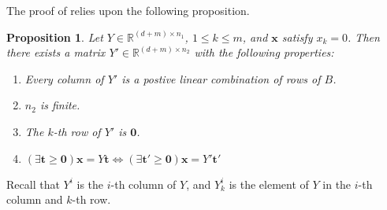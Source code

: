 \documentclass[fleqn]{article}
\renewcommand{\vec}[1]{\mathbf{#1}}
\newcommand{\R}{\mathbb{R}}
\newcommand{\0}{\vec{0}}
\newcommand{\x}{\vec{x}}
\renewcommand{\t}{\vec{t}}
\newcommand{\Yi}{Y^i_{k}}
\newtheorem{Prop}{Proposition}
\begin{document}
The proof of {\Hint} relies upon the following proposition.
\begin{Prop}{\label{Hintset}
Let $Y \in \R^{(d+m)\times n_1}$, $1 \leq k \leq m$, and $\x$ satisfy $x_k = 0$.  Then there exists a matrix $Y' \in \R^{(d+m)\times n_2}$ with the following properties:
  \begin{enumerate}
    \item Every column of $Y'$ is a postive linear combination of rows of $B$.
    \item $n_2$ is finite.
    \item The $k$-th row of $Y'$ is $\0$.
    \item \((\exists \t\geq\0)\x = Y\t \Leftrightarrow (\exists \t' \geq \0)\x = Y'\t'\)
  \end{enumerate}
}\end{Prop}
Recall that $ Y^i$ is the $i$-th column of $ Y$, and $\Yi$ is the element of $ Y$ in the $i$-th column and $k$-th row.  
\end{document}
